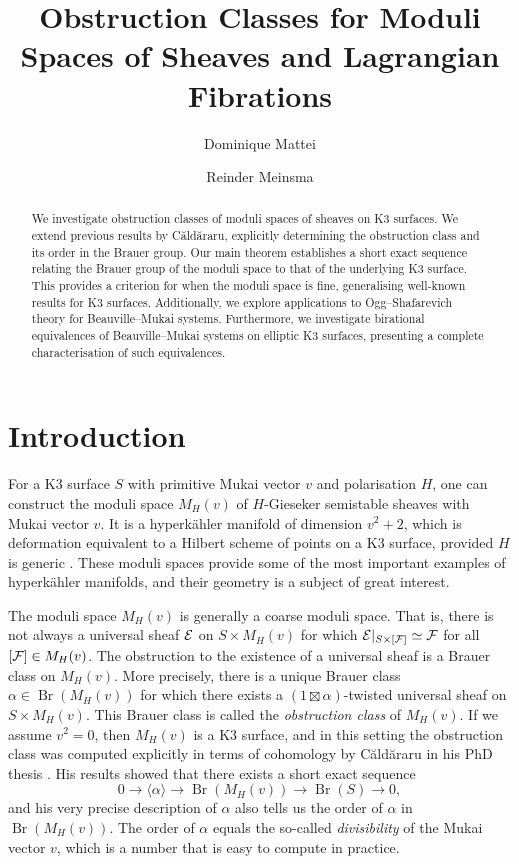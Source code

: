 \documentclass[11pt,twoside]{amsart}
\title{Obstruction Classes for Moduli Spaces of Sheaves and Lagrangian Fibrations}
\author[D.~Mattei]{Dominique Mattei}
\author[R.~Meinsma]{Reinder Meinsma}
\numberwithin{equation}{section}
\theoremstyle{definition}
\theoremstyle{plain}
\def\Br{\operatorname{Br}}
\begin{document}
\begin{abstract}
    We investigate obstruction classes of moduli spaces of sheaves on K3 surfaces. We extend previous results by C\u ald\u araru, explicitly determining the obstruction class and its order in the Brauer group. Our main theorem establishes a short exact sequence relating the Brauer group of the moduli space to that of the underlying K3 surface. This provides a criterion for when the moduli space is fine, generalising well-known results for K3 surfaces. Additionally, we explore applications to Ogg--Shafarevich theory for Beauville--Mukai systems. Furthermore, we investigate birational equivalences of Beauville–Mukai systems on elliptic K3 surfaces, presenting a complete characterisation of such equivalences.
\end{abstract}
\maketitle
\tableofcontents

\section{Introduction}
For a K3 surface $S$ with primitive Mukai vector $v$ and polarisation $H$, one can construct the moduli space $M_H(v)$ of $H$-Gieseker semistable sheaves with Mukai vector $v$. It is a hyperk\"ahler manifold of dimension $v^2+2$, which is deformation equivalent to a Hilbert scheme of points on a K3 surface, provided $H$ is generic \cite{GH96,OGr97,Huy06,BM14ii,BM14i}. These moduli spaces provide some of the most important examples of hyperk\"ahler manifolds, and their geometry is a subject of great interest. 

The moduli space $M_H(v)$ is generally a coarse moduli space. That is, there is not always a universal sheaf $\mathcal{E}$ on $S\times M_H(v)$ for which $\mathcal{E}|_{S\times [\mathcal{F}]}\simeq \mathcal{F}$ for all $[\mathcal{F}]\in M_H(v)$. The obstruction to the existence of a universal sheaf is a Brauer class on $M_H(v)$. 
More precisely, there is a unique Brauer class $\alpha\in \Br(M_H(v))$ for which there exists a $(1\boxtimes \alpha)$-twisted universal sheaf on $S\times M_H(v)$. This Brauer class is called the \textit{obstruction class} of $M_H(v)$. If we assume $v^2=0$, then $M_H(v)$ is a K3 surface, and in this setting the obstruction class was computed explicitly in terms of cohomology by C\u ald\u araru in his PhD thesis \cite{Cal00}. His results showed that there exists a short exact sequence 
\begin{equation}\label{eq:introsesbrauer}
0\to \langle\alpha\rangle\to \Br(M_H(v))\to \Br(S)\to 0,
\end{equation}
and his very precise description of $\alpha$ also tells us the order of $\alpha$ in $\Br(M_H(v))$. The order of $\alpha$ equals the so-called \textit{divisibility} of the Mukai vector $v$, which is a number that is easy to compute in practice.
\end{document}
